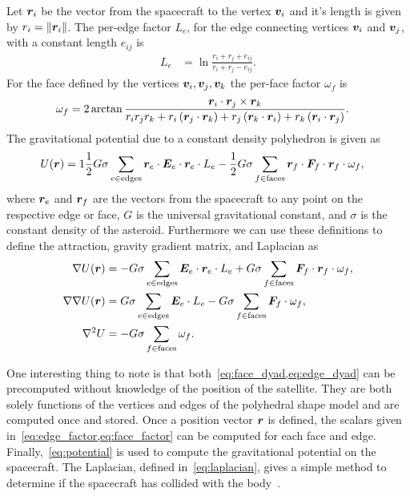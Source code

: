 \documentclass[]{aiaa-tc}%
\begin{document}
Let \( \bm{r}_i \) be the vector from the spacecraft to the vertex \( \bm{v}_i \) and it's length is given by \( r_i = \left\| \bm{r}_i \right\| \).
The per-edge factor \( L_e \), for the edge connecting vertices \( \bm{v}_i \) and \( \bm{v}_j \), with a constant length \( e_{ij} \) is
\begin{align}\label{eq:edge_factor}
    L_e &= \ln \frac{r_i + r_j + e_{ij}}{r_i + r_j - e_{ij}}.
\end{align}
For the face defined by the vertices \( \bm{v}_i, \bm{v}_j, \bm{v}_k \) the per-face factor \( \omega_f \) is
\begin{align}\label{eq:face_factor}
    \omega_f &= 2 \arctan \frac{\bm{r}_i \cdot \bm{r}_j \times \bm{r}_k}{r_i r_j r_k + r_i \left( \bm{r}_j \cdot \bm{r}_k \right) + r_j \left( \bm{r}_k \cdot \bm{r}_i \right) + r_k \left( \bm{r}_i \cdot \bm{r}_j \right)} .
\end{align}
The gravitational potential due to a constant density polyhedron is given as
\begin{align}\label{eq:potential}
    U(\bm{r}) &= 1\frac{1}{2} G \sigma \sum_{e \in \text{edges}} \bm{r}_e \cdot \bm{E}_e \cdot \bm{r}_e \cdot L_e - \frac{1}{2}G \sigma \sum_{f \in \text{faces}} \bm{r}_f \cdot \bm{F}_f \cdot \bm{r}_f \cdot \omega_f ,
\end{align}
where \( \bm{r}_e\) and \(\bm{r}_f \) are the vectors from the spacecraft to any point on the respective edge or face, \( G\) is the universal gravitational constant, and \( \sigma \) is the constant density of the asteroid.
Furthermore we can use these definitions to define the attraction, gravity gradient matrix, and Laplacian as
\begin{align}
    \nabla U ( \bm{r} ) &= -G \sigma \sum_{e \in \text{edges}} \bm{E}_e \cdot \bm{r}_e \cdot L_e + G \sigma \sum_{f \in \text{faces}} \bm{F}_f \cdot \bm{r}_f \cdot \omega_f , \label{eq:attraction}\\
    \nabla \nabla U ( \bm{r} ) &= G \sigma \sum_{e \in \text{edges}} \bm{E}_e  \cdot L_e - G \sigma \sum_{f \in \text{faces}} \bm{F}_f \cdot \omega_f , \label{eq:gradient_matrix}\\
    \nabla^2 U &= -G \sigma \sum_{f \in \text{faces}}  \omega_f \label{eq:laplacian}.
\end{align}

One interesting thing to note is that both~\cref{eq:face_dyad,eq:edge_dyad} can be precomputed without knowledge of the position of the satellite.
They are both solely functions of the vertices and edges of the polyhedral shape model and are computed once and stored.
Once a position vector \( \bm{r} \) is defined, the scalars given in~\cref{eq:edge_factor,eq:face_factor} can be computed for each face and edge.
Finally,~\cref{eq:potential} is used to compute the gravitational potential on the spacecraft.
The Laplacian, defined in~\cref{eq:laplacian}, gives a simple method to determine if the spacecraft has collided with the body~\cite{werner1996}. 
\end{document}
